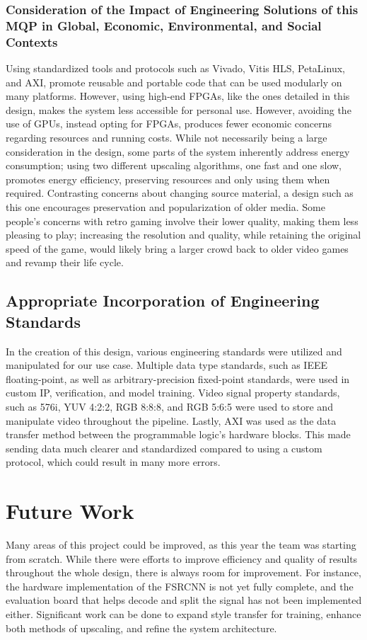 \documentclass{article}
\begin{document}
        \subsubsection{Consideration of the Impact of Engineering Solutions of this MQP in Global, Economic, Environmental, and Social Contexts}
        \noindent Using standardized tools and protocols such as Vivado, Vitis HLS, PetaLinux, and AXI, promote reusable and portable code that can be used modularly on many platforms. However, using high-end FPGAs, like the ones detailed in this design, makes the system less accessible for personal use. However, avoiding the use of GPUs, instead opting for FPGAs, produces fewer economic concerns regarding resources and running costs. While not necessarily being a large consideration in the design, some parts of the system inherently address energy consumption; using two different upscaling algorithms, one fast and one slow, promotes energy efficiency, preserving resources and only using them when required. Contrasting concerns about changing source material, a design such as this one encourages preservation and popularization of older media. Some people’s concerns with retro gaming involve their lower quality, making them less pleasing to play; increasing the resolution and quality, while retaining the original speed of the game, would likely bring a larger crowd back to older video games and revamp their life cycle. 

    \subsection{Appropriate Incorporation of Engineering Standards}
    \noindent 	In the creation of this design, various engineering standards were utilized and manipulated for our use case. Multiple data type standards, such as IEEE floating-point, as well as arbitrary-precision fixed-point standards, were used in custom IP, verification, and model training. Video signal property standards, such as 576i, YUV 4:2:2, RGB 8:8:8, and RGB 5:6:5 were used to store and manipulate video throughout the pipeline. Lastly, AXI was used as the data transfer method between the programmable logic's hardware blocks. This made sending data much clearer and standardized compared to using a custom protocol, which could result in many more errors. 

\newpage\section{Future Work}
\noindent Many areas of this project could be improved, as this year the team was starting from scratch. While there were efforts to improve efficiency and quality of results throughout the whole design, there is always room for improvement. For instance, the hardware implementation of the FSRCNN is not yet fully complete, and the evaluation board that helps decode and split the signal has not been implemented either. Significant work can be done to expand style transfer for training, enhance both methods of upscaling, and refine the system architecture. 
\end{document}
